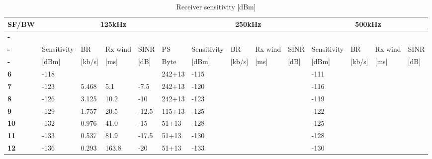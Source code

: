 \begin{table}[h!]
\scriptsize
	\begin{tabular}{l|lllll|llll|llll}
	\textbf{\ac{SF}/\ac{BW}} & \multicolumn{5}{c}{\textbf{125kHz}}                   								& \multicolumn{4}{c}{\textbf{250kHz} }             						& \multicolumn{4}{c}{\textbf{500kHz} }             						 \\\hline
	\textbf{-}     & \cite{varsier_capacity_2017}       & 				  & \cite{loraaliance}	& \cite{lorasite} 	& 			& 			                         & 			 & 			& 			& 			                         & 			 &   		&			 \\
	\textbf{-}     & Sensitivity		                & \ac{BR}		  & Rx wind				& \ac{SINR} 		& \ac{PS}  	& Sensitivity                        & \ac{BR}	 & Rx wind  & \ac{SINR}	& Sensitivity                        & \ac{BR}	 & Rx wind  & \ac{SINR}	 \\
	\textbf{-}     & [dBm]      			            & [kb/s] 		  & [ms]				& [dB] 				& Byte 		& [dBm]      			             & [kb/s] 	 & [ms]		& [dB] 		& [dBm]      			             & [kb/s] 	 & [ms]		& [dB] 		 \\
	\textbf{6}     & -118                               &                 &   					&					& 242+13	& -115                               &           &   		&			& -111                               &           &   		&			 \\
	\textbf{7}     & -123                               & 5.468           & 5.1  				& -7.5				& 242+13	& -120                               &           &   		&			& -116                               &           &   		&			 \\
	\textbf{8}     & -126                               & 3.125           & 10.2  				& -10				& 242+13	& -123                               &           &   		&			& -119                               &           &   		&			 \\
	\textbf{9}     & -129                               & 1.757           & 20.5  				& -12.5				& 115+13	& -125                               &           &   		&			& -122                               &           &   		&			 \\
	\textbf{10}    & -132                               & 0.976           & 41.0  				& -15				& 51+13		& -128                               &           &   		&			& -125                               &           &   		&			 \\
	\textbf{11}    & -133                               & 0.537           & 81.9  				& -17.5				& 51+13		& -130                               &           &   		&			& -128                               &           &   		&			 \\
	\textbf{12}    & -136                               & 0.293           & 163.8  				& -20				& 51+13		& -133                               &           &   		&			& -130                               &           &   		&			 \\\hline
	\end{tabular}
\caption{\label{tab:EE} Receiver sensitivity [dBm]}
\end{table}


